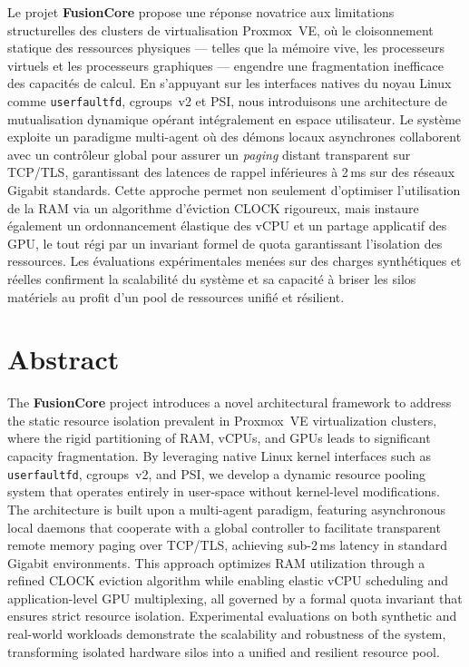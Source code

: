 \documentclass[
    language=french,
    school=estg,
    docstage=final,
    media=paper,
    bookprint=false,
    linkcolor=red!45!black,
    chapterstyle=classic,
    coverstyle=classic,
    aiacknowledgement=false,
    listprefix=false
]{IPLeiriaThesis}
\theoremstyle{definition}
\theoremstyle{plain}
\begin{document}
Le projet \textbf{FusionCore} propose une réponse novatrice aux limitations structurelles des clusters de virtualisation Proxmox~VE, où le cloisonnement statique des ressources physiques — telles que la mémoire vive, les processeurs virtuels et les processeurs graphiques — engendre une fragmentation inefficace des capacités de calcul. En s'appuyant sur les interfaces natives du noyau Linux comme \texttt{userfaultfd}, cgroups~v2 et PSI, nous introduisons une architecture de mutualisation dynamique opérant intégralement en espace utilisateur. Le système exploite un paradigme multi-agent où des démons locaux asynchrones collaborent avec un contrôleur global pour assurer un \textit{paging} distant transparent sur TCP/TLS, garantissant des latences de rappel inférieures à 2\,ms sur des réseaux Gigabit standards. Cette approche permet non seulement d'optimiser l'utilisation de la RAM via un algorithme d'éviction CLOCK rigoureux, mais instaure également un ordonnancement élastique des vCPU et un partage applicatif des GPU, le tout régi par un invariant formel de quota garantissant l'isolation des ressources. Les évaluations expérimentales menées sur des charges synthétiques et réelles confirment la scalabilité du système et sa capacité à briser les silos matériels au profit d'un pool de ressources unifié et résilient.



\chapter*{Abstract}

The \textbf{FusionCore} project introduces a novel architectural framework to address the static resource isolation prevalent in Proxmox~VE virtualization clusters, where the rigid partitioning of RAM, vCPUs, and GPUs leads to significant capacity fragmentation. By leveraging native Linux kernel interfaces such as \texttt{userfaultfd}, cgroups~v2, and PSI, we develop a dynamic resource pooling system that operates entirely in user-space without kernel-level modifications. The architecture is built upon a multi-agent paradigm, featuring asynchronous local daemons that cooperate with a global controller to facilitate transparent remote memory paging over TCP/TLS, achieving sub-2\,ms latency in standard Gigabit environments. This approach optimizes RAM utilization through a refined CLOCK eviction algorithm while enabling elastic vCPU scheduling and application-level GPU multiplexing, all governed by a formal quota invariant that ensures strict resource isolation. Experimental evaluations on both synthetic and real-world workloads demonstrate the scalability and robustness of the system, transforming isolated hardware silos into a unified and resilient resource pool.
\end{document}
